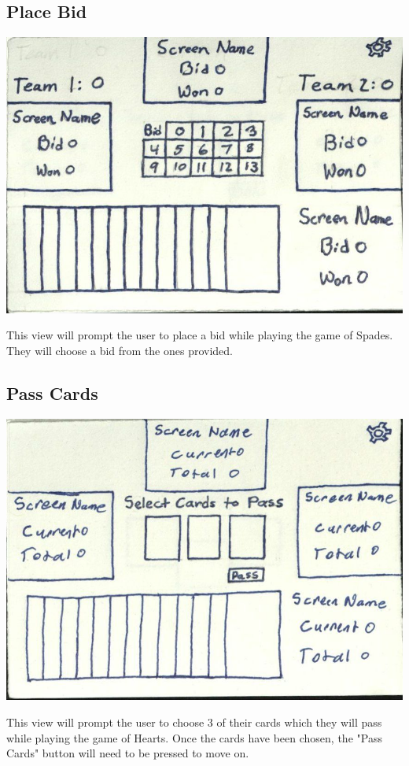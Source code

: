 \documentclass[]{scrartcl}
\begin{document}
\subsection{Place Bid}
\centerline{\includegraphics{6.jpg}}
This view will prompt the user to place a bid while playing the game of Spades. They will choose a bid from the ones provided.

\subsection{Pass Cards}
\centerline{\includegraphics{7.jpg}}
This view will prompt the user to choose 3 of their cards which they will pass while playing the game of Hearts. Once the cards have been chosen, the "Pass Cards" button will need to be pressed to move on.
\end{document}
